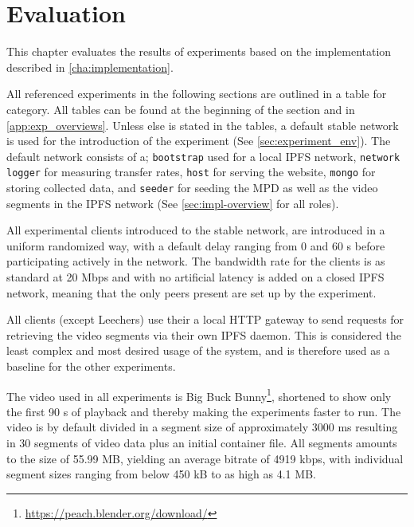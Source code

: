 \chapter{Evaluation}
\label{cha:evaluation}
This chapter evaluates the results of experiments based on the implementation described in \autoref{cha:implementation}.

All referenced experiments in the following sections are outlined in a table for category. All tables can be found at the beginning of the section and in \autoref{app:exp_overviews}. Unless else is stated in the tables, a default stable network is used for the introduction of the experiment (See \autoref{sec:experiment_env}). The default network consists of a; \texttt{bootstrap} used for a local \ac{IPFS} network, \texttt{network logger} for measuring transfer rates, \texttt{host} for serving the website, \texttt{mongo} for storing collected data, and \texttt{seeder} for seeding the \ac{MPD} as well as the video segments in the \ac{IPFS} network (See  \autoref{sec:impl-overview} for all roles).

All experimental clients introduced to the stable network, are introduced in a uniform randomized way, with a default delay ranging from 0 and 60 \ac{s} before participating actively in the network.
The bandwidth rate for the clients is as standard at 20 \ac{Mbps} and with no artificial latency is added on a closed \ac{IPFS} network, meaning that the only peers present are set up by the experiment.

All clients (except Leechers) use their a local \ac{HTTP} gateway to send requests for retrieving the video segments via their own \ac{IPFS} daemon. This is considered the least complex and most desired usage of the system, and is therefore used as a baseline for the other experiments.

The video used in all experiments is Big Buck Bunny\footnote{\url{https://peach.blender.org/download/}}, shortened to show only the first 90 \ac{s} of playback and thereby making the experiments faster to run. The video is by default divided in a segment size of approximately 3000 \ac{ms} resulting in 30 segments of video data plus an initial container file. All segments amounts to the size of 55.99 \ac{MB}, yielding an average bitrate of 4919 \ac{kbps}, with individual segment sizes ranging from below 450 \ac{kB} to as high as 4.1 \ac{MB}.

